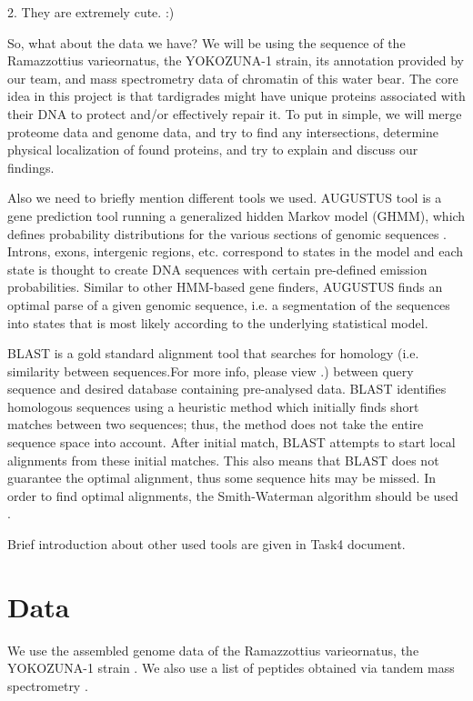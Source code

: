 \documentclass{article}
\begin{document}
 2. They are extremely cute. :)
 
 So, what about the data we have? We will be using the sequence of the Ramazzottius varieornatus, the YOKOZUNA-1 strain, its annotation provided by our team, and mass spectrometry data of chromatin of this water bear. The core idea in this project is that tardigrades might have unique proteins associated with their DNA to protect and/or effectively repair it. To put in simple, we will merge proteome data and genome data, and try to find any intersections, determine physical localization of found proteins, and try to explain and discuss our findings.
 
 Also we need to briefly mention different tools we used. 
 AUGUSTUS tool is a gene prediction tool running a generalized hidden Markov model (GHMM), which defines probability distributions for the various sections of genomic sequences \cite{augustus}. Introns, exons, intergenic regions, etc. correspond to states in the model and each state is thought to create DNA sequences with certain pre-defined emission probabilities. Similar to other HMM-based gene finders, AUGUSTUS finds an optimal parse of a given genomic sequence, i.e. a segmentation of the sequences into states that is most likely according to the underlying statistical model. 
 
 BLAST is a gold standard alignment tool that searches for homology (i.e. similarity between sequences.For more info, please view \cite{4}.) between query sequence and desired database containing pre-analysed data. BLAST identifies homologous sequences using a heuristic method which initially finds short matches between two sequences; thus, the method does not take the entire sequence space into account. After initial match, BLAST attempts to start local alignments from these initial matches. This also means that BLAST does not guarantee the optimal alignment, thus some sequence hits may be missed. In order to find optimal alignments, the Smith-Waterman algorithm should be used \cite{2, 3}.
  
 Brief introduction about other used tools are given in Task4 document.
 
 
 \section{Data}
 We use the assembled genome data of the Ramazzottius varieornatus, the YOKOZUNA-1 strain \cite{data}. We also use a list of peptides obtained  via tandem mass spectrometry \cite{peptides}. 
 
\end{document}
